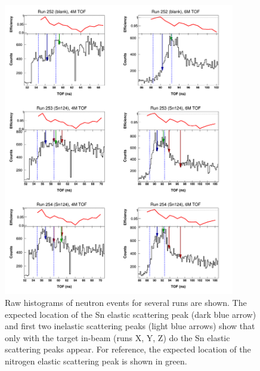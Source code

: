 \begin{figure}
    \includegraphics[width = 0.9\textwidth]{figures/tiledRunData.png}
    \caption{Raw histograms of neutron events for several runs are shown. The
        expected location of the Sn elastic scattering peak (dark blue arrow)
        and first two inelastic scattering peaks (light blue arrows) show that
        only with the target in-beam (runs X, Y, Z) do the Sn elastic scattering
        peaks appear. For reference, the expected location of the nitrogen elastic scattering
    peak is shown in green.} \label{tiledRunData}
\end{figure}

